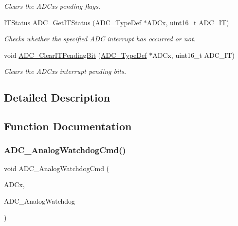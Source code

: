 \begin{DoxyCompactItemize}
\begin{DoxyCompactList}\small\item\em Clears the A\+D\+Cx\textquotesingle{}s pending flags. \end{DoxyCompactList}\item 
\hyperlink{group___exported__types_gaacbd7ed539db0aacd973a0f6eca34074}{I\+T\+Status} \hyperlink{group___a_d_c___private___functions_gaa1d3b910a83dbf14d4f68c8eef058612}{A\+D\+C\+\_\+\+Get\+I\+T\+Status} (\hyperlink{struct_a_d_c___type_def}{A\+D\+C\+\_\+\+Type\+Def} $\ast$A\+D\+Cx, uint16\+\_\+t A\+D\+C\+\_\+\+IT)
\begin{DoxyCompactList}\small\item\em Checks whether the specified A\+DC interrupt has occurred or not. \end{DoxyCompactList}\item 
void \hyperlink{group___a_d_c___private___functions_ga601c6a67bd883eb631ecc7aa5e999b9c}{A\+D\+C\+\_\+\+Clear\+I\+T\+Pending\+Bit} (\hyperlink{struct_a_d_c___type_def}{A\+D\+C\+\_\+\+Type\+Def} $\ast$A\+D\+Cx, uint16\+\_\+t A\+D\+C\+\_\+\+IT)
\begin{DoxyCompactList}\small\item\em Clears the A\+D\+Cx\textquotesingle{}s interrupt pending bits. \end{DoxyCompactList}\end{DoxyCompactItemize}


\subsection{Detailed Description}


\subsection{Function Documentation}
\mbox{\label{group___a_d_c___private___functions_gad017d69bec6e497afd35ba25ea22d86e}} 
\subsubsection{\texorpdfstring{A\+D\+C\+\_\+\+Analog\+Watchdog\+Cmd()}{ADC\_AnalogWatchdogCmd()}}
{\footnotesize\ttfamily void A\+D\+C\+\_\+\+Analog\+Watchdog\+Cmd (\begin{DoxyParamCaption}\item[{\hyperlink{struct_a_d_c___type_def}{A\+D\+C\+\_\+\+Type\+Def} $\ast$}]{A\+D\+Cx,  }\item[{uint32\+\_\+t}]{A\+D\+C\+\_\+\+Analog\+Watchdog }\end{DoxyParamCaption})}



